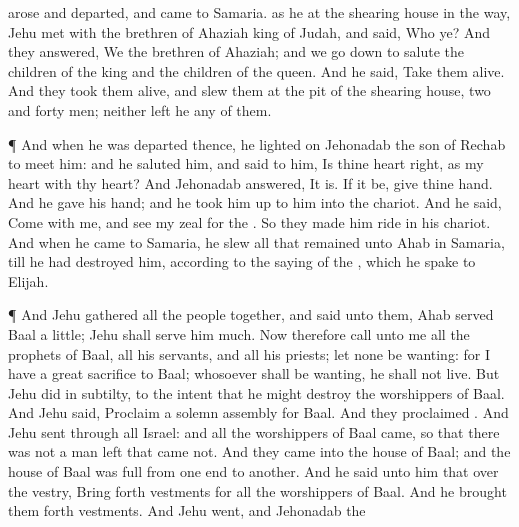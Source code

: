 {arose and
departed, and
came to
Samaria.
{} as he
{} at the
shearing
house in the
way,
Jehu
met with the
brethren of
Ahaziah
king of
Judah, and
said, Who
{} ye? And they
answered, We
{} the
brethren of
Ahaziah; and we go
down to
salute the
children of the
king and the
children of the
queen.
And he
said,
Take them
alive. And they
took them
alive, and
slew them at the
pit of the shearing
house,
{}
two and
forty
men; neither
left he
any of them.
\par }{\PP {}¶ And when he was
departed thence, he
lighted on
Jehonadab the
son of
Rechab
{} to
meet him: and he
saluted him, and
said to him,
Is thine
heart
right, as my
heart
{} with thy
heart? And
Jehonadab
answered, It
is. If it be,
give
{} thine
hand. And he
gave
{} his
hand; and he took him
up to him into the
chariot.
And he
said,
Come with me, and
see my
zeal for the
{}. So they made him
ride in his
chariot.
And when he
came to
Samaria, he
slew all that
remained unto
Ahab in
Samaria, till he had
destroyed him, according to the
saying of the
{}, which he
spake to
Elijah.
\par }{\PP {}¶ And
Jehu
gathered all the
people
together, and
said unto them,
Ahab
served
Baal a
little;
{}
Jehu shall
serve him
much.
Now therefore
call unto me all the
prophets of
Baal, all his
servants, and all his
priests; let
none be
wanting: for I have a
great
sacrifice
{} to
Baal; whosoever shall be
wanting, he shall not
live. But
Jehu
did
{} in
subtilty, to the intent that he might
destroy the
worshippers of
Baal.
And
Jehu
said,
Proclaim a solemn
assembly for
Baal. And they
proclaimed
{}.
And
Jehu
sent through all
Israel: and all the
worshippers of
Baal
came, so that there was not a
man
left that
came not. And they
came into the
house of
Baal; and the
house of
Baal was
full from one
end to
another.
And he
said unto him that
{} over the
vestry, Bring
forth
vestments for all the
worshippers of
Baal. And he brought them
forth
vestments.
And
Jehu
went, and
Jehonadab the
}
